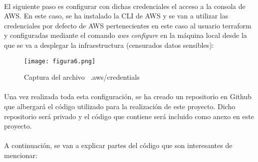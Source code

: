 \documentclass[../../memoria.tex]{subfiles}
\begin{document}
\paragraph{}
El siguiente paso es configurar con dichas credenciales el acceso a la consola de AWS. En este caso, se ha instalado la CLI de AWS \cite{awscli} y se van a utilizar las credenciales por defecto de AWS pertenecientes en este caso al usuario terraform y configuradas mediante el comando \textit{aws configure} en la máquina local desde la que se va a desplegar la infraestructura (censurados datos sensibles):

\begin{figure}[H]
    \centering
    \texttt{[image: figura6.png]}
    \caption{Captura del archivo ~.aws/credentials}
    \label{fig:figura6}
\end{figure}

\paragraph{}
Una vez realizada toda esta configuración, se ha creado un repositorio en Github que albergará el código utilizado para la realización de este proyecto. Dicho repositorio será privado y el código que contiene será incluido como anexo en este proyecto.

\paragraph{}
A continuación, se van a explicar partes del código que son interesantes de mencionar:
\end{document}
